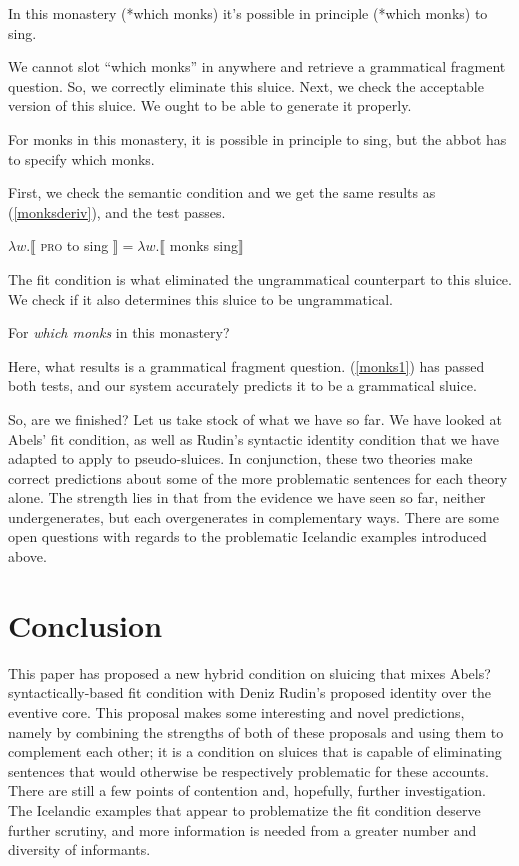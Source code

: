 \documentclass{turabian-researchpaper}
\begin{document}
\begin{exe}
\ex\label{monksbadsprout3} In this monastery (*which monks) it's possible in principle (*which monks) to sing. 
\end{exe}

We cannot slot ``which monks'' in anywhere and retrieve a grammatical fragment question. So, we correctly eliminate this sluice. Next, we check the acceptable version of this sluice. We ought to be able to generate it properly. 

\begin{exe}
 For monks in this monastery, it is possible in principle to sing, but the abbot has to specify which monks. 
\end{exe}

First, we check the semantic condition and we get the same results as (\ref{monksderiv}), and the test passes. 

\begin{exe}
\ex  $\lambda w.\llbracket$ \textsc{pro} to sing $\rrbracket =  \lambda w.\llbracket$ monks sing$\rrbracket$ 
\end{exe}

The fit condition is what eliminated the ungrammatical counterpart to this sluice. We check if it also determines this sluice to be ungrammatical. 

\begin{exe}
\ex For \textit{which monks} in this monastery?
\end{exe}

Here, what results is a grammatical fragment question. (\ref{monks1}) has passed both tests, and our system accurately predicts it to be a grammatical sluice. 

So, are we finished? Let us take stock of what we have so far. We have looked at Abels' fit condition, as well as Rudin's syntactic identity condition that we have adapted to apply to pseudo-sluices. In conjunction, these two theories make correct predictions about some of the more problematic sentences for each theory alone. The strength lies in that from the evidence we have seen so far, neither undergenerates, but each overgenerates in complementary ways. There are some open questions with regards to the problematic Icelandic examples introduced above. 

\section{Conclusion}
This paper has proposed a new hybrid condition on sluicing that mixes Abels? syntactically-based fit condition with Deniz Rudin's proposed identity over the eventive core. This proposal makes some interesting and novel predictions, namely by combining the strengths of both of these proposals and using them to complement each other; it is a condition on sluices that is capable of eliminating sentences that would otherwise be respectively problematic for these accounts. There are still a few points of contention and, hopefully, further investigation. The Icelandic examples that appear to problematize the fit condition deserve further scrutiny, and more information is needed from a greater number and diversity of informants. 
\end{document}
